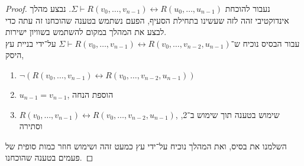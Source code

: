\begin{proof}
	נעבור להוכחת $\Sigma \vdash R(v_0, \dots, v_{n - 1}) \leftrightarrow R(u_0, \dots, u_{n - 1})$.
	נבצע מהלך אינדוקטיבי זהה לזה שעשינו בתחילת הסעיף, הפעם נשתמש בטענה שהוכחנו זה עתה כדי לבצע את המהלך במקום להשתמש בשוויון ישירות. \\
	עבור הבסיס נוכיח ש־$\Sigma \vdash R(v_0, \dots, v_{n - 1}) \leftrightarrow R(v_0, \dots, v_{n - 2}, u_{n - 1})$ על־ידי בניית עץ היסק,
	\begin{enumerate}
		\item $\lnot (R(v_0, \dots, v_{n - 1}) \leftrightarrow R(v_0, \dots, v_{n - 2}, u_{n - 1}))$
		\item $u_{n - 1} = v_{n - 1}$, הוספת הנחה
		\item $R(v_0, \dots, v_{n - 1}) \leftrightarrow R(v_0, \dots, v_{n - 2}, u_{n - 1})$, שימוש בטענה תוך שימוש ב־2, וסתירה
	\end{enumerate}
	השלמנו את בסיס, ואת המהלך נוכיח על־ידי עץ כמעט זהה ושימוש חוזר כמות סופית של פעמים בטענה שהוכחנו.
\end{proof}


